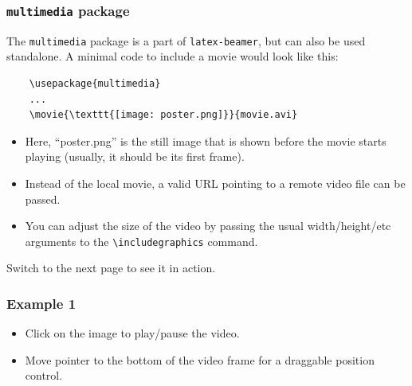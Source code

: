 \documentclass{beamer}
\newcommand{\opt}[1]{\texttt{#1}\xspace}
\begin{document}
\begin{frame}[fragile]
  \frametitle{\opt{multimedia} package}

  The \opt{multimedia} package is a part of \opt{latex-beamer}, but can
  also be used standalone. A minimal code to include a movie would look like
  this:

  \begin{lstlisting}
    \usepackage{multimedia}
    ...
    \movie{\texttt{[image: poster.png]}}{movie.avi}
  \end{lstlisting}

  \begin{itemize}
    \item Here, ``poster.png'' is the still image that is shown before the movie
      starts playing (usually, it should be its first frame).
    \item Instead of the local movie, a valid URL pointing to a remote video
      file can be passed.
    \item You can adjust the size of the video by passing the usual
      width/height/etc arguments to the {\opt{\textbackslash includegraphics}}
      command.
  \end{itemize}

  \vspace{10pt}
  Switch to the next page to see it in action.
\end{frame}

\begin{frame}
  \frametitle{Example 1}
  \vspace{10pt}
  \begin{center}
  \end{center}
    
  \begin{itemize}
    \item Click on the image to play/pause the video.
    \item Move pointer to the bottom of the video frame for a draggable position
      control.
  \end{itemize}
\end{frame}
\end{document}
